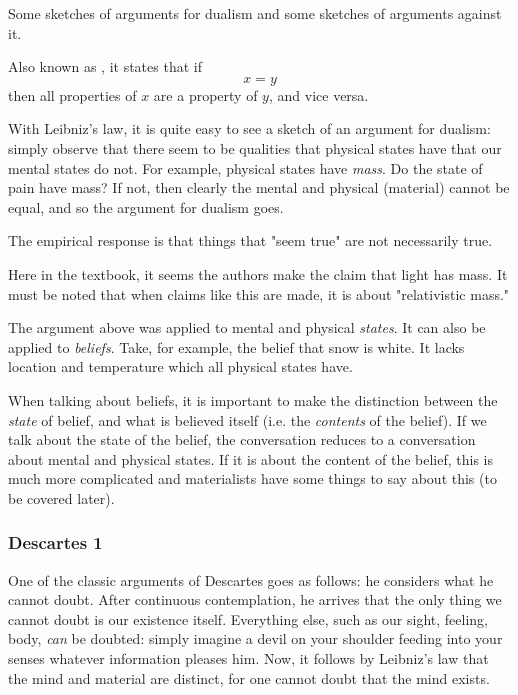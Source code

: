 Some sketches of arguments for dualism and some sketches of arguments against it.

\begin{definition}
    Also known as , it states that if $$x = y$$ then all properties of $x$ are a property of $y$, and vice versa.
\end{definition}

With Leibniz's law, it is quite easy to see a sketch of an argument for dualism: simply observe that there seem to be qualities that physical states have that our mental states do not. For example, physical states have \textit{mass}. Do the state of pain have mass? If not, then clearly the mental and physical (material) cannot be equal, and so the argument for dualism goes.

The empirical response is that things that "seem true" are not necessarily true.
\begin{remark}
    Here in the textbook, it seems the authors make the claim that light has mass. It must be noted that when claims like this are made, it is about "relativistic mass."
\end{remark}

The argument above was applied to mental and physical \textit{states}. It can also be applied to \textit{beliefs}. Take, for example, the belief that snow is white. It lacks location and temperature which all physical states have.

When talking about beliefs, it is important to make the distinction  between the \textit{state} of belief, and what is believed itself (i.e. the \textit{contents} of the belief). If we talk about the state of the belief, the conversation reduces to a conversation about mental and physical states. If it is about the content of the belief, this is much more complicated and materialists have some things to say about this (to be covered later).

\subsubsection{Descartes 1}

One of the classic arguments of Descartes goes as follows: he considers what he cannot doubt. After continuous contemplation, he arrives that the only thing we cannot doubt is our existence itself. Everything else, such as our sight, feeling, body, \textit{can} be doubted: simply imagine a devil on your shoulder feeding into your senses whatever information pleases him. Now, it follows by Leibniz's law that the mind and material are distinct, for one cannot doubt that the mind exists.

